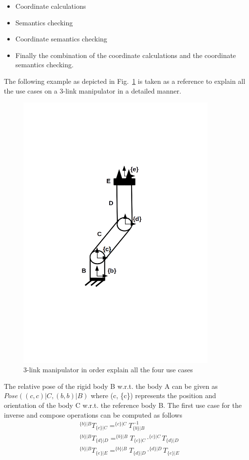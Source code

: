 \begin{itemize}
\item Coordinate calculations 
\item Semantics checking 
\item Coordinate semantics checking
\item Finally the combination of the coordinate calculations and the coordinate semantics checking. 
\end{itemize}

The following example as depicted in Fig.~\ref{fig:semanticsusecases} is taken as a reference to explain all the use cases on a 3-link manipulator in a detailed manner. 

\begin{figure}[H]
\centering
\includegraphics[width=100mm, trim=0 250 0 200]{pictures/semantics_usecases}
\caption{3-link manipulator in order explain all the four use cases}
\label{fig:semanticsusecases}
\end{figure}

The relative pose of the rigid body B w.r.t. the body A can be given as $Pose ((c,{c}) | C, (b,{b}) | B)$ where (c, \{c\}) represents the position and orientation of the body C w.r.t. the reference body B. The first use case for the inverse and compose operations can be computed as follows
\begin{align}
& ^{\{b\}|B}T_{\{c\}|C} = ^{\{c\}|C}T^{-1}_{\{b\}|B} \\
& ^{\{b\}|B}T_{\{d\}|D} = ^{\{b\}|B}T_{\{c\}|C} \cdot ^{\{c\}|C}T_{\{d\}|D} \\
& ^{\{b\}|B}T_{\{e\}|E} = ^{\{b\}|B}T_{\{d\}|D} \cdot ^{\{d\}|D}T_{\{e\}|E}
\end{align}

